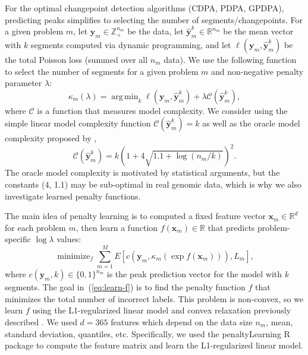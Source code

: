 \documentclass[twoside,11pt]{article}
\DeclareMathOperator*{\argmin}{arg\,min}
\DeclareMathOperator*{\minimize}{minimize}
\newcommand{\ZZ}{\mathbb Z}
\newcommand{\RR}{\mathbb R}
\begin{document}
For the optimal changepoint detection algorithms (CDPA, PDPA, GPDPA),
predicting peaks simplifies to selecting the number of
segments/changepoints. For a given problem $m$, let
$\mathbf y_m\in\ZZ_+^{n_m}$ be the data, let
$\mathbf{\hat y}_m^k\in\RR^{n_m}$ be the mean vector with $k$
segments computed via dynamic programming, and let $\ell(\mathbf y_m, \mathbf{\hat y}^k_m)$ be the
total Poisson loss (summed over all $n_m$ data). We use the following
function to select the number of segments for a given
problem $m$ and non-negative penalty parameter $\lambda$:
\begin{equation}
  \kappa_m(\lambda)=\argmin_{k} \ell(\mathbf y_m, \mathbf{\hat y}^k_m)
+ \lambda \mathcal C(\mathbf{\hat y}^k_m),
\end{equation} 
where $\mathcal C$ is a function that measures model complexity. We consider using the simple linear model complexity function $\mathcal C(\mathbf{\hat y}^k_m)=k$ as well as the oracle model complexity
proposed by \citet{cleynen2013segmentation},
\begin{equation}
\label{eq:oracle}
\mathcal C(\mathbf{\hat y}^k_m) =
k\left(
1 + 4\sqrt{1.1 + \log( n_m/k)}
\right)^2.
\end{equation}
The oracle model complexity is motivated by statistical arguments, but
the constants (4, 1.1) may be sub-optimal in real genomic data, which
is why we also investigate learned penalty functions.

The main idea of penalty learning \citep{HOCKING-penalties} is to
computed a fixed feature vector $\mathbf x_m\in\RR^d$ for each problem
$m$, then learn a function $f(\mathbf x_m)\in\RR$ that predicts
problem-specific $\log\lambda$ values:
\begin{equation}
  \label{eq:learn-f}
  \minimize_{f}
  \sum_{m=1}^M E\left[
    c(\mathbf y_m, \kappa_m(\exp f(\mathbf x_m))), 
    L_m\right],
\end{equation}
where $c(\mathbf y_m, k)\in\{0,1\}^{n_m}$ is the peak prediction
vector for the model with $k$ segments. The goal in~(\ref{eq:learn-f})
is to find the penalty function $f$ that minimizes the total number of
incorrect labels. This problem is non-convex, so we learn $f$ using
the L1-regularized linear model and convex relaxation previously
described \citep{HOCKING-penalties}. We used $d=365$ features which
depend on the data size $n_m$, mean, standard deviation, quantiles,
etc. Specifically, we used the penaltyLearning R
package to compute the feature matrix and learn the L1-regularized
linear model.
\end{document}
